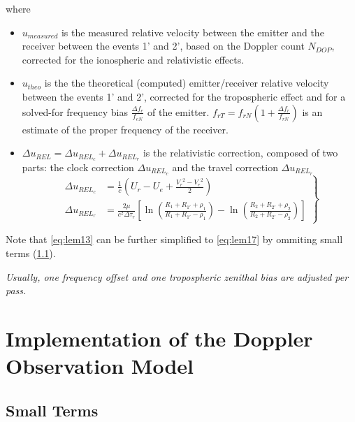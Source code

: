 where 
\begin{itemize}
    \item \(u_{measured}\) is the measured relative velocity between the emitter and 
    the receiver between the events 1' and 2', based on the Doppler count \(N_{DOP}\), 
    corrected for the ionospheric and relativistic effects.

    \item \(u_{theo}\) is the the theoretical (computed) emitter/receiver relative velocity 
    between the events 1' and 2', corrected for the tropospheric effect and for a solved-for 
    frequency bias \(\frac{\Delta f_e}{f_{eN}}\) of the emitter. \(f_{rT} = f_{rN} (1 + \frac{\Delta f_r}{f_{rN}})\) 
    is an estimate of the proper frequency of the receiver.

    \item \(\Delta u_{REL} = \Delta u_{{REL}_c} + \Delta u_{{REL}_r}\) is the relativistic 
    correction, composed of two parts: the clock correction \(\Delta u_{{REL}_c}\) and the 
    travel correction \(\Delta u_{{REL}_r}\)
    \begin{equation}
        \left.\begin{aligned}
            \Delta u_{{REL}_c} & = \frac{1}{c} (U_r - U_e + \frac{{V_r}^2 - {V_e}^2}{2})\\
            \Delta u_{{REL}_r} & = \frac{2 \mu}{c^2 \Delta\tau_r} [\ln{(\frac{R_1 + R_{1'} + \rho_1}{R_1 + R_{1'} - \rho_1})} - \ln{(\frac{R_2 + R_{2'} + \rho_2}{R_2 + R_{2'} - \rho_2})}]
        \end{aligned}
    \right\}
    \end{equation}
\end{itemize}

Note that \ref{eq:lem13} can be further simplified to \ref{eq:lem17} by ommiting small terms (\ref{ssec:small-terms}).

\emph{Usually, one frequency offset and one tropospheric zenithal bias are adjusted per pass.}

\section{Implementation of the Doppler Observation Model}

\subsection{Small Terms}
\label{ssec:small-terms}

